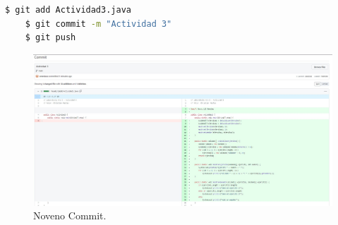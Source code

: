 \documentclass{article}
\begin{document}
\begin{lstlisting}[language=bash,caption={Noveno Commit / Actividad3.java}]
	$ git add Actividad3.java
	$ git commit -m "Actividad 3"
	$ git push
\end{lstlisting}
\begin{figure}[H]
	\centering
	\includegraphics[width=1\textwidth,keepaspectratio]{img/commit09.jpg}
	\caption{Noveno Commit.}
\end{figure}
\pagebreak
\end{document}
